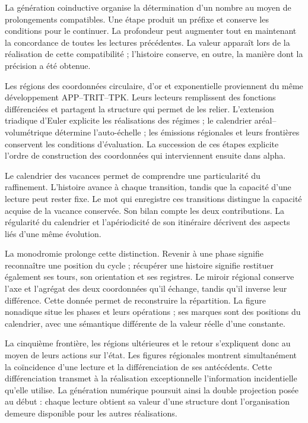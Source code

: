 
La génération coinductive organise la détermination d’un nombre au moyen de
prolongements compatibles. Une étape produit un préfixe et conserve les
conditions pour le continuer. La profondeur peut augmenter tout en maintenant
la concordance de toutes les lectures précédentes. La valeur apparaît lors de la
réalisation de cette compatibilité ; l’histoire conserve, en outre, la manière dont
la précision a été obtenue.

Les régions des coordonnées circulaire, d’or et exponentielle proviennent du
même développement APP--TRIT--TPK. Leurs lecteurs remplissent des fonctions
différenciées et partagent la structure qui permet de les relier.
L’extension triadique d’Euler explicite les réalisations des régimes ;
le calendrier aréal--volumétrique détermine l’auto-échelle ; les émissions
régionales et leurs frontières conservent les conditions d’évaluation.
La succession de ces étapes explicite l’ordre de construction des
coordonnées qui interviennent ensuite dans alpha.

Le calendrier des vacances permet de comprendre une particularité du
raffinement. L’histoire avance à chaque transition, tandis que la capacité
d’une lecture peut rester fixe. Le mot qui enregistre ces
transitions distingue la capacité acquise de la vacance conservée.
Son bilan compte les deux contributions. La régularité du calendrier et
l’apériodicité de son itinéraire décrivent des aspects liés d’une
même évolution.

La monodromie prolonge cette distinction. Revenir à une phase signifie reconnaître une position du cycle ; récupérer une histoire signifie restituer également ses tours, son orientation et ses registres. Le miroir régional conserve l'axe et l'agrégat des deux coordonnées qu'il échange, tandis qu'il inverse leur différence. Cette donnée permet de reconstruire la répartition. La figure nonadique situe les phases et leurs opérations ; ses marques sont des positions du calendrier, avec une sémantique différente de la valeur réelle d'une constante.

La cinquième frontière, les régions ultérieures et le retour s’expliquent
donc au moyen de leurs actions sur l’état. Les figures régionales
montrent simultanément la coïncidence d’une lecture et la différenciation de
ses antécédents. Cette différenciation transmet à la réalisation
exceptionnelle l’information incidentielle qu’elle utilise. La génération
numérique poursuit ainsi la double projection posée au début : chaque
lecture obtient sa valeur d’une structure dont l’organisation demeure
disponible pour les autres réalisations.

